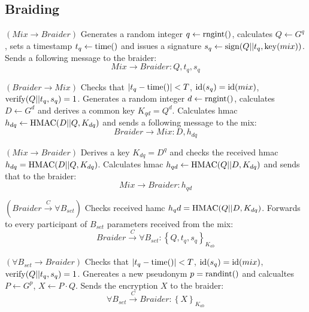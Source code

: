 \documentclass[12pt]{article}
\begin{document}
\subsection*{Braiding}

\begin{steps}
\item $(Mix \to Braider)$ Generates a random integer $q \leftarrow {\rm rngint}()$, calculates $Q \leftarrow G^q$, sets a timestamp $t_q \leftarrow {\rm time}()$ and issues a signature $s_q \leftarrow {\rm sign}(Q||t_q, {\rm key}(mix))$. Sends a following message to the braider:
  \begin{equation}
    Mix \to Braider: Q, t_q, s_q
  \end{equation}
\item $(Braider \to Mix)$ Checks that $|t_q - {\rm time}()|<T$, ${\rm id}(s_q)={\rm id}(mix)$, ${\rm verify}(Q||t_q, s_q) = 1$. Generates a random integer $d \leftarrow {\rm rngint}()$, calculates $D \leftarrow G^d$ and derives a common key $K_{qd} = Q^d$. Calculates hmac $h_{dq} \leftarrow {\rm HMAC}(D||Q,K_{dq})$ and sends a following message to the mix:
  \begin{equation}
    Braider \to Mix: D, h_{dq}
  \end{equation}
\item $(Mix \to Braider)$ Derives a key $K_{dq}=D^q$ and checks the received hmac $h_{dq} = {\rm HMAC}(D||Q,K_{dq})$. Calculates hmac $h_{qd} \leftarrow {\rm HMAC}(Q||D,K_{dq})$ and sends that to the braider:
  \begin{equation}
    Mix \to Braider: h_{qd}
  \end{equation}
\item $(Braider \overset{C}{\to} \forall B_{set})$ Checks received hamc $h_qd = {\rm HMAC}(Q||D,K_{dq})$. Forwards to every participant of $B_{set}$ parameters received from the mix:
  \begin{equation}
    Braider \overset{C}{\to} \forall B_{set}: \left\{ Q, t_q, s_q \right\}_{K_{ab}}
  \end{equation}
  
\item $(\forall B_{set} \to Braider)$ Checks that $|t_q - {\rm time}()|<T$, ${\rm id}(s_q)={\rm id}(mix)$, ${\rm verify}(Q||t_q, s_q) = 1$. Gnereates a new pseudonym $p={\rm randint}()$ and calcualtes $P \leftarrow G^p$, $X \leftarrow P \cdot Q$. Sends the encryption $X$ to the braider:
  \begin{equation}
    \forall B_{set} \overset{C}{\to} Braider: \left\{ X \right\}_{K_{ab}}
  \end{equation}
  

\end{steps}
\end{document}
